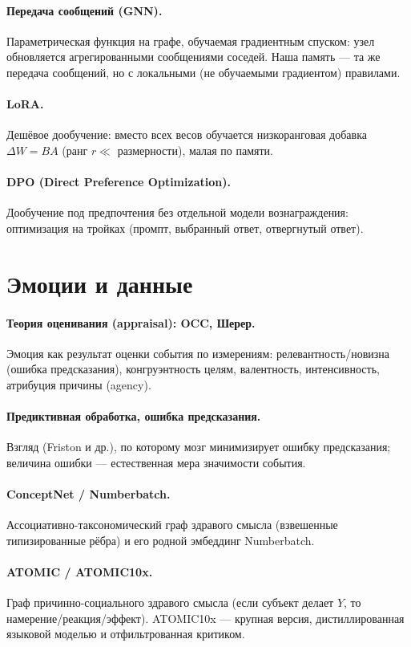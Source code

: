 \paragraph{Передача сообщений (GNN).} Параметрическая функция на графе,
обучаемая градиентным спуском: узел обновляется агрегированными сообщениями
соседей. Наша память --- та же передача сообщений, но с локальными (не
обучаемыми градиентом) правилами.

\paragraph{LoRA.} Дешёвое дообучение: вместо всех весов обучается
низкоранговая добавка $\Delta W=BA$ (ранг $r\ll$ размерности), малая по
памяти.

\paragraph{DPO (Direct Preference Optimization).} Дообучение под
предпочтения без отдельной модели вознаграждения: оптимизация на тройках
(промпт, выбранный ответ, отвергнутый ответ).

\section*{Эмоции и данные}

\paragraph{Теория оценивания (appraisal): OCC, Шерер.} Эмоция как результат
оценки события по измерениям: релевантность/новизна (ошибка предсказания),
конгруэнтность целям, валентность, интенсивность, атрибуция причины
(agency).

\paragraph{Предиктивная обработка, ошибка предсказания.} Взгляд (Friston и
др.), по которому мозг минимизирует ошибку предсказания; величина ошибки ---
естественная мера значимости события.

\paragraph{ConceptNet / Numberbatch.} Ассоциативно-таксономический граф
здравого смысла (взвешенные типизированные рёбра) и его родной эмбеддинг
Numberbatch.

\paragraph{ATOMIC / ATOMIC10x.} Граф причинно-социального здравого смысла
(если субъект делает $Y$, то намерение/реакция/эффект). ATOMIC10x ---
крупная версия, дистиллированная языковой моделью и отфильтрованная
критиком.

